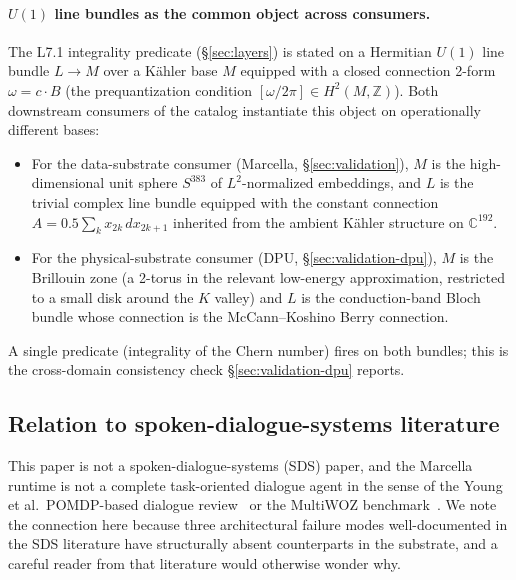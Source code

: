 \documentclass[11pt,letterpaper]{article}
\begin{document}
\paragraph{$U(1)$ line bundles as the common object across consumers.}
The L7.1 integrality predicate (\S\ref{sec:layers}) is stated on a
Hermitian $U(1)$ line bundle $L \to M$ over a K\"ahler base $M$
equipped with a closed connection 2-form $\omega = c \cdot B$ (the
prequantization condition $[\omega / 2\pi] \in H^2(M, \mathbb{Z})$).
Both downstream consumers of the catalog instantiate this object on
operationally different bases:
\begin{itemize}[nosep]
\item For the data-substrate consumer (Marcella,
  \S\ref{sec:validation}), $M$ is the high-dimensional unit sphere
  $S^{383}$ of $L^2$-normalized embeddings, and $L$ is the trivial
  complex line bundle equipped with the constant connection
  $A = 0.5 \sum_k x_{2k}\, dx_{2k+1}$ inherited from the ambient
  K\"ahler structure on $\mathbb{C}^{192}$.
\item For the physical-substrate consumer (DPU,
  \S\ref{sec:validation-dpu}), $M$ is the Brillouin zone (a 2-torus
  in the relevant low-energy approximation, restricted to a small
  disk around the $K$ valley) and $L$ is the conduction-band Bloch
  bundle whose connection is the McCann--Koshino
  Berry connection.
\end{itemize}
A single predicate (integrality of the Chern number) fires on both
bundles; this is the cross-domain consistency check
\S\ref{sec:validation-dpu} reports.

\subsection{Relation to spoken-dialogue-systems literature}
\label{sec:sds-relation}

This paper is not a spoken-dialogue-systems (SDS) paper, and the
Marcella runtime is not a complete task-oriented dialogue agent in
the sense of the Young et al.\ POMDP-based dialogue
review~\cite{young2013pomdp} or the MultiWOZ
benchmark~\cite{budzianowski2018multiwoz}. We note the connection
here because three architectural failure modes well-documented in
the SDS literature have structurally absent counterparts in the
substrate, and a careful reader from that literature would
otherwise wonder why.
\end{document}
